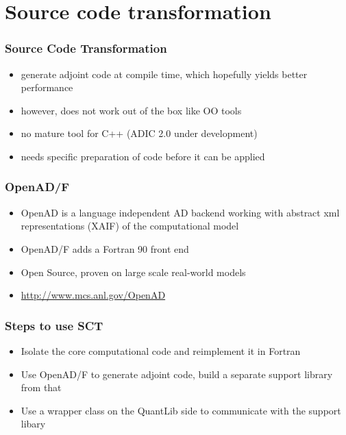 \documentclass{beamer}
\begin{document}
\section{Source code transformation}

\begin{frame}[fragile]
\frametitle{Source Code Transformation}
\begin{itemize}
\item generate adjoint code at compile time, which hopefully yields better performance
\item however, does not work out of the box like OO tools
\item no mature tool for C++ (ADIC 2.0 under development)
\item needs specific preparation of code before it can be applied
\end{itemize}
\end{frame}

\begin{frame}[fragile]
\frametitle{OpenAD/F}
\begin{itemize}
\item OpenAD is a language independent AD backend working with abstract xml representations (XAIF) of the computational model
\item OpenAD/F adds a Fortran 90 front end
\item Open Source, proven on large scale real-world models
\item \url{http://www.mcs.anl.gov/OpenAD}
\end{itemize}
\end{frame}

\begin{frame}[fragile]
\frametitle{Steps to use SCT}
\begin{itemize}
\item Isolate the core computational code and reimplement it in Fortran
\item Use OpenAD/F to generate adjoint code, build a separate support library from that
\item Use a wrapper class on the QuantLib side to communicate with the support libary
\end{itemize}
\end{frame}
\end{document}
